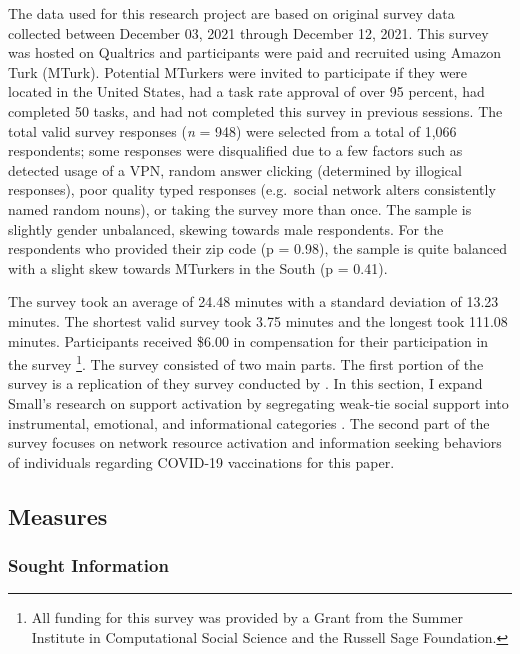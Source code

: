 The data used for this research project are based on original survey data
collected between December 03, 2021 through December 12, 2021. This survey was
hosted on Qualtrics and participants were paid and recruited using Amazon Turk
(MTurk). Potential MTurkers were invited to participate if they were located in
the United States, had a task rate approval of over 95 percent, had completed 50
tasks, and had not completed this survey in previous sessions. The total valid
survey responses (\emph{n} = 948) were selected from a total of 1,066
respondents; some responses were disqualified due to a few factors such as
detected usage of a VPN, random answer clicking (determined by illogical
responses), poor quality typed responses (e.g.\, social network alters
consistently named random nouns), or taking the survey more than once. The
sample is slightly gender unbalanced, skewing towards male respondents. For the
respondents who provided their zip code (p = 0.98), the sample is quite balanced
with a slight skew towards MTurkers in the South (p = 0.41).

The survey took an average of 24.48 minutes with a standard deviation of 13.23
minutes. The shortest valid survey took 3.75 minutes and the longest took 111.08
minutes. Participants received \$6.00 in compensation for their participation in
the survey \footnote{All funding for this survey was provided by a Grant from
the Summer Institute in Computational Social Science and the Russell Sage
Foundation.}. The survey consisted of two main parts. The first portion of the
survey is a replication of they survey conducted by
\citet{smallSomeoneTalk2017}. In this section, I expand Small's research on
support activation by segregating weak-tie social support into instrumental,
emotional, and informational categories
\citep[see][]{houseStructuresProcessesSocial1988}. The second part of the survey
focuses on network resource activation and information seeking behaviors of
individuals regarding COVID-19 vaccinations for this paper.



\hypertarget{measures}{\subsection{Measures}\label{measures}}

\hypertarget{sought-information}{\subsubsection{Sought Information}\label{sought-information}}

